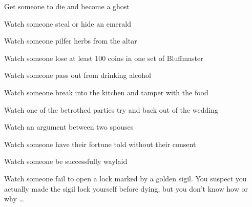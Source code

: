 \documentclass[char]{Kos}
\begin{document}
\begin{itemz}[Goals]
 \item Get someone to die and become a ghost
 \item Watch someone steal or hide an emerald
 \item Watch someone pilfer herbs from the altar
 \item Watch someone lose at least 100 coins in one set of Bluffmaster
 \item Watch someone pass out from drinking alcohol
 \item Watch someone break into the kitchen and tamper with the food
 \item Watch one of the betrothed parties try and back out of the wedding
 \item Watch an argument between two spouses
 \item Watch someone have their fortune told without their consent
  \item Watch someone be successfully waylaid
  \item Watch someone fail to open a lock marked by a golden sigil. You suspect you actually made the sigil lock yourself before dying, but you don't know how or why \ldots
\end{itemz}
\end{document}
